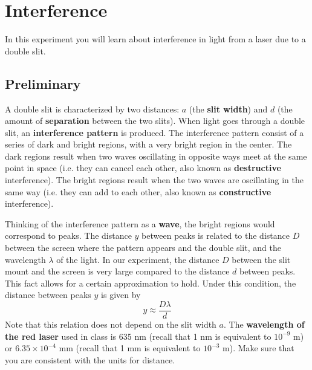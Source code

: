\setcounter{chapter}{9}
\chapter{Interference}
In this experiment you will learn about interference in light from a laser due to a double slit.
\section{Preliminary}
A double slit is characterized by two distances: $a$ (the \textbf{slit width}) and $d$ (the amount of \textbf{separation} between the two slits). When light goes through a double slit, an \textbf{interference pattern} is produced. The interference pattern consist of a series of dark and bright regions, with a very bright region in the center. The dark regions result when two waves oscillating in opposite ways meet at the same point in space (i.e. they can cancel each other, also known as \textbf{destructive} interference). The bright regions result when the two waves are oscillating in the same way (i.e. they can add to each other, also known as \textbf{constructive} interference).

Thinking of the interference pattern as a \textbf{wave}, the bright regions would correspond to peaks. The distance $y$ between peaks is related to the distance $D$ between the screen where the pattern appears and the double slit, and the wavelength $\lambda$ of the light. In our experiment, the distance $D$ between the slit mount and the screen is very large compared to the distance $d$ between peaks. This fact allows for a certain approximation to hold. Under this condition, the distance between peaks $y$ is given by
\begin{equation} \label{y.eq}
	y \approx \frac{D \lambda}{d}
\end{equation}
Note that this relation does not depend on the slit width $a$. The \textbf{wavelength of the red laser} used in class is 635 nm (recall that 1 nm is equivalent to $10^{-9}$ m) or $6.35 \times 10^{-4}$ mm (recall that 1 mm is equivalent to $10^{-3}$ m). Make sure that you are consistent with the units for distance.
